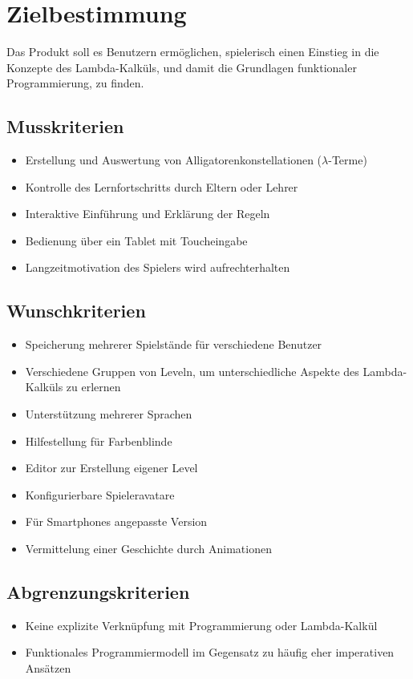 \section{Zielbestimmung}
Das Produkt soll es Benutzern ermöglichen, spielerisch einen Einstieg in die Konzepte des Lambda-Kalküls, und damit die Grundlagen funktionaler Programmierung, zu finden.

\subsection{Musskriterien}

\begin{itemize}
	\item Erstellung und Auswertung von Alligatorenkonstellationen (\(\lambda\)-Terme)
	\item Kontrolle des Lernfortschritts durch Eltern oder Lehrer
	\item Interaktive Einführung und Erklärung der Regeln
	\item Bedienung über ein Tablet mit Toucheingabe
	\item Langzeitmotivation des Spielers wird aufrechterhalten
\end{itemize}


\subsection{Wunschkriterien}

\begin{itemize}
	\item Speicherung mehrerer Spielstände für verschiedene Benutzer
	\item Verschiedene Gruppen von Leveln, um unterschiedliche Aspekte des Lambda-Kalküls zu erlernen
	\item Unterstützung mehrerer Sprachen
	\item Hilfestellung für Farbenblinde
	\item Editor zur Erstellung eigener Level
	\item Konfigurierbare Spieleravatare
	\item Für Smartphones angepasste Version
	\item Vermittelung einer Geschichte durch Animationen
\end{itemize}


\subsection{Abgrenzungskriterien}

\begin{itemize}
	\item Keine explizite Verknüpfung mit Programmierung oder Lambda-Kalkül
	\item Funktionales Programmiermodell im Gegensatz zu häufig eher imperativen Ansätzen
\end{itemize}

